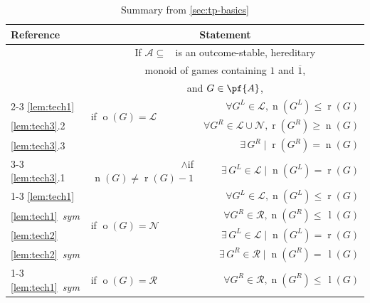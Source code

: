 \documentclass[11pt]{article}
\theoremstyle{definition}
\DeclareMathOperator{\outcome}{o}
\newcommand{\set}[1]{\mathcal{#1}}
\DeclareMathOperator{\maug}{\set{M}_\text{aug}}
\DeclareMathOperator{\ltp}{l}
\DeclareMathOperator{\ntp}{n}
\DeclareMathOperator{\rtp}{r}
\begin{document}
\renewcommand{\arraystretch}{1.2}
\setlength{\tabcolsep}{4pt}
\begin{table}[h]
\caption{Summary from \cref{sec:tp-basics}}
\vspace{3pt}
\centering
\begin{tabular}{l|lr}
    \hline
    \rowcolor{gray!50} Reference & \multicolumn{2}{c}{Statement} \\[2pt]
    \hline
                                 & \multicolumn{2}{c}{If
                                     $\set{A}\subseteq\maug$ is an
                                 outcome-stable, hereditary}\\
                                 & \multicolumn{2}{c}{monoid of games
                                     containing $1$ and
                                 $\overline{1}$,}\\
                                 & \multicolumn{2}{c}{and
                                 $G\in\pf{A}$,}\\
    \cmidrule(lr){2-3}
    \cref{lem:tech1} & \multirow{2}{*}{if $\outcome(G)=\mathscr{L}$} &
    $\forall G^L \in \mathscr{L}, \ntp(G^L)\leq\rtp(G)$ \\
    \cref{lem:tech3}.2 & & $\forall G^R \in \mathscr{L}\cup\mathscr{N},
    \rtp(G^R)\geq\ntp(G)$\\
    \cref{lem:tech3}.3 & & $\exists \, G^R \mid\rtp(G^R)=\ntp(G)$ \\
    \cmidrule(lr){3-3}
    \cref{lem:tech3}.1 & \multicolumn{1}{r}{$\land$if
    $\ntp(G)\neq\rtp(G)-1$}
                       &
    $\exists
    \, G^L \in \mathscr{L}\mid \ntp(G^L)=\rtp(G)$\\
    \cmidrule(lr){1-3}
    \cref{lem:tech1} & \multirow{4}{*}{if $\outcome(G)=\mathscr{N}$} &
    $\forall G^L \in \mathscr{L}, \ntp(G^L)\leq\rtp(G)$ \\
    \cref{lem:tech1}{\footnotesize \it ~sym}& & $\forall G^R \in \mathscr{R},
    \ntp(G^R)\leq\hspace{2pt}\ltp(G)$\\
    \cref{lem:tech2} & & $\exists \, G^L \in
    \mathscr{L}\mid\ntp(G^L)=\rtp(G)$\\
    \cref{lem:tech2}{\footnotesize \it ~sym}& & $\exists \, G^R \in 
    \mathscr{R}\mid
    \ntp(G^R)=\hspace{2pt}\ltp(G)$\\
    \cmidrule(lr){1-3}
    \cref{lem:tech1}{\footnotesize \it ~sym}& \multirow{2}{*}{if 
    $\outcome(G)=\mathscr{R}$} &
    $\forall G^R \in \mathscr{R}, \ntp(G^R)\leq\hspace{2pt}\ltp(G)$ \\

\end{tabular}
\end{table}
\end{document}
